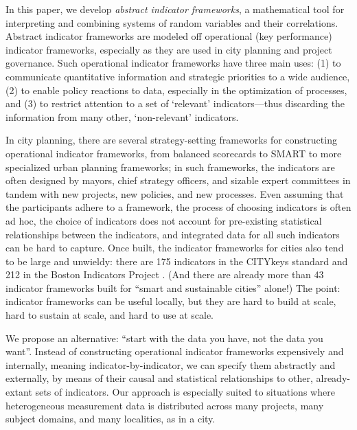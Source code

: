\documentclass{article}
\theoremstyle{definition}
\begin{document}
In this paper, we develop \emph{abstract indicator frameworks}, a mathematical tool for interpreting and combining systems of random variables and their correlations. Abstract indicator frameworks are modeled off operational (key performance) indicator frameworks, especially as they are used in city planning and project governance. Such operational indicator frameworks have three main uses: (1) to communicate quantitative information and strategic priorities to a wide audience, (2) to enable policy reactions to data, especially in the optimization of processes, and (3) to restrict attention to a set of `relevant' indicators---thus discarding the information from many other, `non-relevant' indicators. %

In city planning, there are several strategy-setting frameworks for constructing operational indicator frameworks, from balanced scorecards \cite{epstein1997balanced} to SMART \cite{doran1981there} to more specialized urban planning frameworks; in such frameworks, the indicators are often designed by mayors, chief strategy officers, and sizable expert committees in tandem with new projects, new policies, and new processes. Even assuming that the participants adhere to a framework, the process of choosing indicators is often ad hoc, the choice of indicators does not account for pre-existing statistical relationships between the indicators, and integrated data for all such indicators can be hard to capture. Once built, the indicator frameworks for cities also tend to be large and unwieldy: there are 175 indicators in the CITYkeys standard \cite{citykeys??} and 212 in the Boston Indicators Project \cite{bostonindicators??}. (And there are already more than 43 indicator frameworks built for ``smart and sustainable cities'' alone!) The point: indicator frameworks can be useful locally, but they are hard to build at scale, hard to sustain at scale, and hard to use at scale.


We propose an alternative: ``start with the data you have, not the data you want''. Instead of constructing operational indicator frameworks expensively and internally, meaning indicator-by-indicator, we can specify them abstractly and externally, by means of their causal and statistical relationships to other, already-extant sets of indicators. Our approach is especially suited to situations where heterogeneous measurement data is distributed across many projects, many subject domains, and many localities, as in a city.
 
\end{document}
